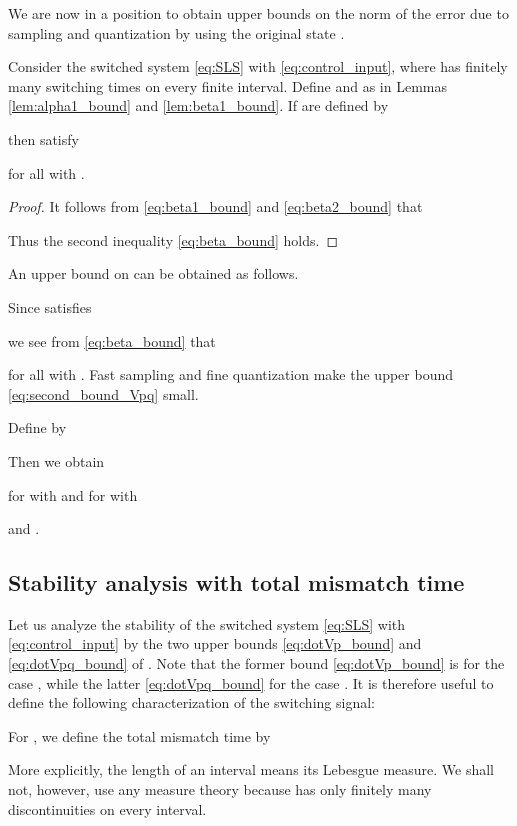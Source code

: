 \documentclass[a4, 11pt]{article}
\begin{document}
We are now in a position to obtain upper bounds on
the norm of  
the error 
 due to
sampling and quantization by using
the original state .
\begin{theorem}
\label{thm:alpha_beta_bound}
Consider the switched system \eqref{eq:SLS} with \eqref{eq:control_input}, 
where  has finitely many switching times
on every finite interval.
Define  and  as in Lemmas 
\ref{lem:alpha1_bound} and \ref{lem:beta1_bound}.
If  are defined by

then  satisfy

for all  with 
.
\end{theorem}
\begin{proof}
It follows from \eqref{eq:beta1_bound} and \eqref{eq:beta2_bound} that

Thus the second inequality \eqref{eq:beta_bound} holds.
\end{proof}

An upper bound on 
can be obtained as follows.



Since  satisfies

we see from \eqref{eq:beta_bound} that

for all  with 
.
Fast sampling and fine quantization make
the upper bound \eqref{eq:second_bound_Vpq} small.

Define  by

Then we obtain

for  with  and
for  with

and .





\subsection{Stability analysis with total mismatch time}
Let us analyze the stability of 
the switched system \eqref{eq:SLS} with \eqref{eq:control_input} by the two
upper bounds \eqref{eq:dotVp_bound} and 
\eqref{eq:dotVpq_bound} of .
Note that
the former bound \eqref{eq:dotVp_bound} 
is for the case , while
the latter \eqref{eq:dotVpq_bound} for the case .
It is therefore useful to define the following characterization of the 
switching signal:
\begin{definition}
For , 
we define the total mismatch time  by

\end{definition}
More explicitly, 
the length of an interval means its Lebesgue measure.
We shall not, however, use any measure theory because
 has only finitely many discontinuities
on every interval.
\end{document}
